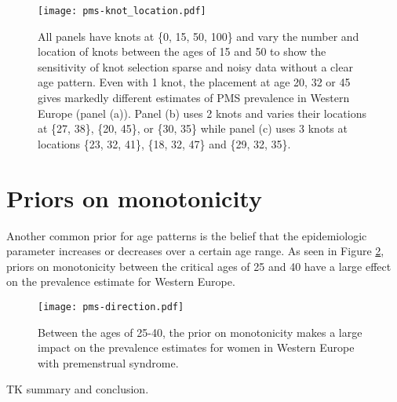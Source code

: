     \begin{figure}
        \begin{center}
            \texttt{[image: pms-knot\_location.pdf]}
        \end{center}
        \caption{All panels have knots at \{0, 15, 50, 100\} and vary
          the number and location of knots between the ages of 15 and
          50 to show the sensitivity of knot selection sparse and
          noisy data without a clear age pattern. Even with 1 knot,
          the placement at age 20, 32 or 45 gives markedly different
          estimates of PMS prevalence in Western Europe (panel (a)).
          Panel (b) uses 2 knots and varies their locations at \{27,
          38\}, \{20, 45\}, or \{30, 35\} while panel (c) uses 3 knots
          at locations \{23, 32, 41\}, \{18, 32, 47\} and \{29, 32,
          35\}.}
        \label{fig:app-knot_loc}
    \end{figure}

\section{Priors on monotonicity}
Another common prior for age patterns is the belief that the
epidemiologic parameter increases or decreases over a certain age
range.  As seen in Figure \ref{fig:app-knot_loc}, priors on
monotonicity between the critical ages of 25 and 40 have a large
effect on the prevalence estimate for Western Europe.

    \begin{figure}
        \begin{center}
            \texttt{[image: pms-direction.pdf]}
        \end{center}
        \caption{Between the ages of 25-40, the prior on monotonicity
          makes a large impact on the prevalence estimates for women
          in Western Europe with premenstrual syndrome.}
        \label{fig:app-knot_loc}
    \end{figure} 

TK summary and conclusion.

